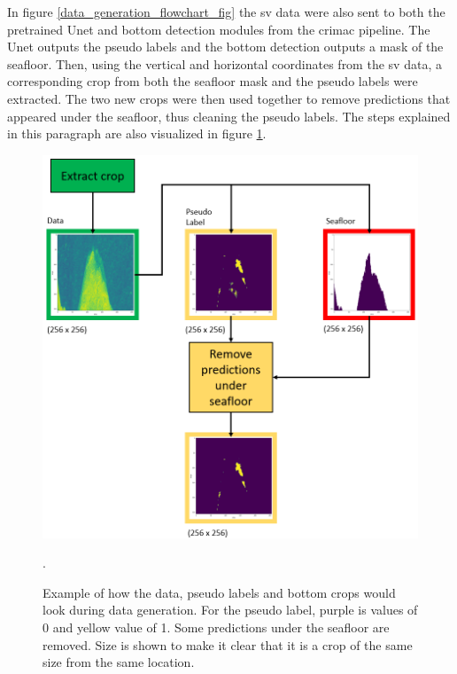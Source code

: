         In figure \ref{data_generation_flowchart_fig} the \gls{sv} data were also sent to both the pretrained Unet and bottom detection modules from the \gls{crimac} pipeline. The Unet outputs the pseudo labels and the bottom detection outputs a mask of the seafloor. Then, using the vertical and horizontal coordinates from the \gls{sv} data, a corresponding crop from both the seafloor mask and the pseudo labels were extracted. The two new crops were then used together to remove predictions that appeared under the seafloor, thus cleaning the pseudo labels. The steps explained in this paragraph are also visualized in figure \ref{crop_extract_fig}.
        \clearpage
        \begin{figure}[H]
            \centering
            \includegraphics[scale=0.5]{figures/crop_extract_illustration.png}
            \caption[Data, label and bottom crop extraction and interaction]{Example of how the data, pseudo labels and bottom crops would look during data generation. For the pseudo label, purple is values of 0 and yellow value of 1. Some predictions under the seafloor are removed.  Size is shown to make it clear that it is a crop of the same size from the same location.}.
          	\medskip 
            \label{crop_extract_fig}
        \end{figure}
        
